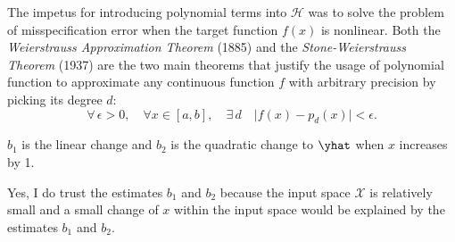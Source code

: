 \documentclass[12pt]{article}
\begin{document}
\begin{enumerate}

\begin{tcolorbox}[colback=white, sharp corners]
The impetus for introducing polynomial terms into $\mathcal{H}$ was to solve the problem of misspecification error when the target function $f(x)$ is nonlinear. Both the \emph{Weierstrauss Approximation Theorem} (1885) and the \emph{Stone-Weierstrauss Theorem} (1937) are the two main theorems that justify the usage of polynomial function to approximate any continuous function $f$ with arbitrary precision by picking its degree $d$: 
\[
	\forall \, \epsilon > 0, \quad \forall x \in [a,b], \quad \exists \, d \quad \vert f(x) - p_d(x) \vert < \epsilon.
\]
\end{tcolorbox}


\begin{tcolorbox}[colback=white, sharp corners]
$b_1$ is the linear change and $b_2$ is the quadratic change to $\yhat$ when $x$ increases by 1.
\end{tcolorbox}


\begin{tcolorbox}[colback=white, sharp corners]
Yes, I do trust the estimates $b_1$ and $b_2$ because the input space $\mathcal{X}$ is relatively small and a small change of $x$ within the input space would be explained by the estimates $b_1$ and $b_2$. 
\end{tcolorbox}


\end{enumerate}
\end{document}

